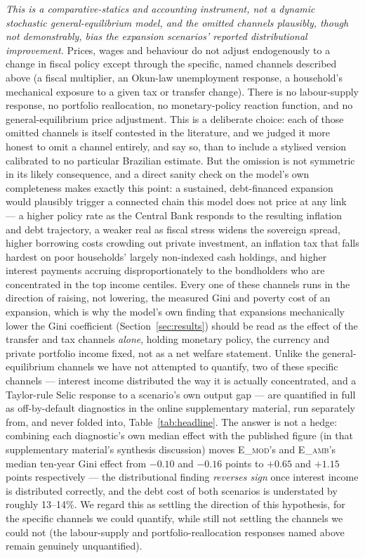 \documentclass[11pt,a4paper]{article}
\begin{document}
\emph{This is a comparative-statics and accounting instrument, not a dynamic stochastic general-equilibrium model, and the omitted channels plausibly, though not demonstrably, bias the expansion scenarios' reported distributional improvement.} Prices, wages and behaviour do not adjust endogenously to a change in fiscal policy except through the specific, named channels described above (a fiscal multiplier, an Okun-law unemployment response, a household's mechanical exposure to a given tax or transfer change). There is no labour-supply response, no portfolio reallocation, no monetary-policy reaction function, and no general-equilibrium price adjustment. This is a deliberate choice: each of those omitted channels is itself contested in the literature, and we judged it more honest to omit a channel entirely, and say so, than to include a stylised version calibrated to no particular Brazilian estimate. But the omission is not symmetric in its likely consequence, and a direct sanity check on the model's own completeness makes exactly this point: a sustained, debt-financed expansion would plausibly trigger a connected chain this model does not price at any link --- a higher policy rate as the Central Bank responds to the resulting inflation and debt trajectory, a weaker real as fiscal stress widens the sovereign spread, higher borrowing costs crowding out private investment, an inflation tax that falls hardest on poor households' largely non-indexed cash holdings, and higher interest payments accruing disproportionately to the bondholders who are concentrated in the top income centiles. Every one of these channels runs in the direction of raising, not lowering, the measured Gini and poverty cost of an expansion, which is why the model's own finding that expansions mechanically lower the Gini coefficient (Section~\ref{sec:results}) should be read as the effect of the transfer and tax channels \emph{alone}, holding monetary policy, the currency and private portfolio income fixed, not as a net welfare statement. Unlike the general-equilibrium channels we have not attempted to quantify, two of these specific channels --- interest income distributed the way it is actually concentrated, and a Taylor-rule Selic response to a scenario's own output gap --- are quantified in full as off-by-default diagnostics in the online supplementary material, run separately from, and never folded into, Table~\ref{tab:headline}. The answer is not a hedge: combining each diagnostic's own median effect with the published figure (in that supplementary material's synthesis discussion) moves \textsc{E\_mod}'s and \textsc{E\_amb}'s median ten-year Gini effect from $-0.10$ and $-0.16$ points to $+0.65$ and $+1.15$ points respectively --- the distributional finding \emph{reverses sign} once interest income is distributed correctly, and the debt cost of both scenarios is understated by roughly 13--14\%. We regard this as settling the direction of this hypothesis, for the specific channels we could quantify, while still not settling the channels we could not (the labour-supply and portfolio-reallocation responses named above remain genuinely unquantified).
\end{document}
